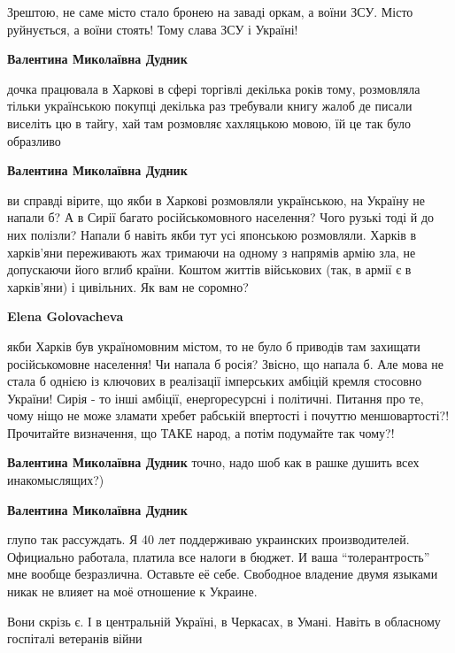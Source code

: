 \begin{itemize}
\begin{itemize}
Зрештою, не саме місто стало бронею на заваді оркам, а воїни ЗСУ. Місто
руйнується, а воїни стоять! Тому слава ЗСУ і Україні!

\textbf{Валентина Миколаївна Дудник} 

дочка працювала в Харкові в сфері торгівлі декілька років тому, розмовляла
тільки українською покупці декілька раз требували книгу жалоб де писали
виселіть цю в тайгу, хай там розмовляє хахляцькою мовою, їй це так було
образливо

\textbf{Валентина Миколаївна Дудник} 

ви справді вірите, що якби в Харкові розмовляли українською, на Україну не
напали б? А в Сирії багато російськомовного населення? Чого рузькі тоді й до
них полізли? Напали б навіть якби тут усі японською розмовляли. Харків в
харків'яни переживають жах тримаючи на одному з напрямів армію зла, не
допускаючи його вглиб країни. Коштом життів військових (так, в армії є в
харків'яни) і цивільних. Як вам не соромно?

\textbf{Elena Golovacheva} 

якби Харків був україномовним містом, то не було б приводів там захищати
російськомовне населення! Чи напала б росія? Звісно, що напала б. Але мова не
стала б однією із ключових в реалізації імперських амбіцій кремля стосовно
України! Сирія - то інші амбіції, енергоресурсні і політичні. Питання про те,
чому ніщо не може зламати хребет рабській впертості і почуттю меншовартості?!
Прочитайте визначення, що ТАКЕ народ, а потім подумайте так чому?!

\textbf{Валентина Миколаївна Дудник} точно, надо шоб как в рашке душить всех инакомыслящих?)

\textbf{Валентина Миколаївна Дудник} 

глупо так рассуждать. Я 40 лет поддерживаю украинских производителей.
Официально работала, платила все налоги в бюджет. И ваша \enquote{толерантрость} мне
вообще безразлична. Оставьте её себе. Свободное владение двумя языками никак не
влияет на моё отношение к Украине.

\end{itemize} %


Вони скрізь є. І в центральній Україні, в Черкасах, в Умані. Навіть в обласному
госпіталі ветеранів війни



\end{itemize}
